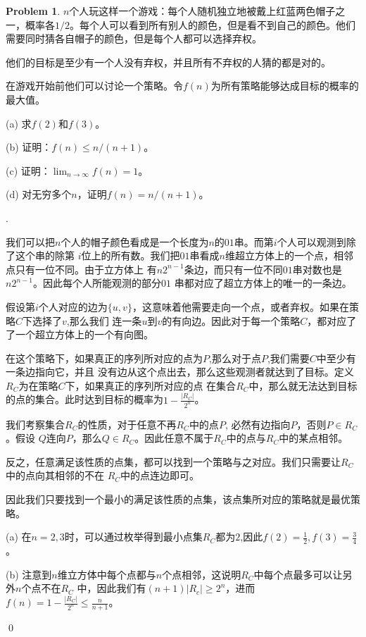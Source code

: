\documentclass[UTF8]{ctexart}
\newenvironment{sol}
  {\par\vspace{3mm}\indent{\it Solution}.
  \setlength{\parindent}{2em}}
  {\qed \\ \medskip}
\theoremstyle{definition}
\newtheorem{problem}{Problem}
\begin{document}
\begin{problem}
$n$个人玩这样一个游戏：每个人随机独立地被戴上红蓝两色帽子之一，概率各$1/2$。每个人可以看到所有别人的颜色，但是看不到自己的颜色。他们需要同时猜各自帽子的颜色，但是每个人都可以选择弃权。

他们的目标是至少有一个人没有弃权，并且所有不弃权的人猜的都是对的。

在游戏开始前他们可以讨论一个策略。令$f(n)$为所有策略能够达成目标的概率的最大值。

(a) 求$f(2)$和$f(3)$。

(b) 证明：$f(n) \leq n/(n+1)$。

(c) 证明：$\lim_{n \to \infty} f(n) = 1$。

(d) 对无穷多个$n$，证明$f(n) = n/(n+1)$。

\begin{sol}
    
    我们可以把$n$个人的帽子颜色看成是一个长度为$n$的$01$串。而第$i$个人可以观测到除了这个串的除第
    $i$位上的所有数。我们把$01$串看成$n$维超立方体上的一个点，相邻点只有一位不同。由于立方体上
    有$n2^{n-1}$条边，而只有一位不同$01$串对数也是$n2^{n-1}$。因此每个人所能观测的部分$01$
    串都对应了超立方体上的唯一的一条边。

    假设第$i$个人对应的边为$\{u, v\}$，这意味着他需要走向一个点，或者弃权。如果在策略$C$下选择了$v$,那么我们
    连一条$u$到$v$的有向边。因此对于每一个策略$C$，都对应了了一个超立方体上的一个有向图。

    在这个策略下，如果真正的序列所对应的点为$P$,那么对于点$P$,我们需要$C$中至少有一条边指向它，并且
    没有边从这个点出去，那么这些观测者就达到了目标。定义$R_C$为在策略$C$下，如果真正的序列所对应的点
    在集合$R_C$中，那么就无法达到目标的点的集合。此时达到目标的概率为$1 - \frac {|R_C|} {2^n}$。

    我们考察集合$R_C$的性质，对于任意不再$R_C$中的点$P$, 必然有边指向$P$，否则$P\in R_C$。假设
    $Q$连向$P$，那么$Q \in R_C$。因此任意不属于$R_C$中的点与$R_C$中的某点相邻。
    
    反之，任意满足该性质的点集，都可以找到一个策略与之对应。我们只需要让$R_C$中的点向其相邻的不在
    $R_C$中的点连边即可。

    因此我们只要找到一个最小的满足该性质的点集，该点集所对应的策略就是最优策略。

    \noindent (a) 在$n=2,3$时，可以通过枚举得到最小点集$R_C$都为$2$,因此$f(2)=\frac 1 2,f(3)=\frac 3 4$。

    \noindent (b) 注意到$n$维立方体中每个点都与$n$个点相邻，这说明$R_C$中每个点最多可以让另外$n$个点不在$R_C$
    中，因此我们有$(n+1)|R_c|\geq 2^n$，进而
    $f(n)=1-\frac {|R_C|}{2^n} \leq \frac n {n+1}$。


\end{sol}
\end{problem}
\end{document}
